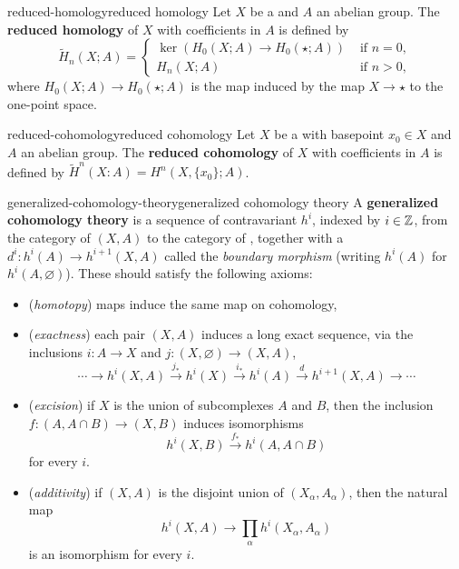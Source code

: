 \begin{topic}{reduced-homology}{reduced homology}
    Let $X$ be a  and $A$ an abelian group. The \textbf{reduced homology} of $X$ with coefficients in $A$ is defined by
    \[ \tilde{H}_n(X; A) = \left\{ \begin{array}{ll} \ker(H_0(X; A) \to H_0(\star; A)) & \text{ if } n = 0 , \\ H_n(X; A) & \text{ if } n > 0 , \end{array} \right. \]
    where $H_0(X; A) \to H_0(\star; A)$ is the map induced by the map $X \to \star$ to the one-point space.
\end{topic}

\begin{topic}{reduced-cohomology}{reduced cohomology}
    Let $X$ be a  with basepoint $x_0 \in X$ and $A$ an abelian group. The \textbf{reduced cohomology} of $X$ with coefficients in $A$ is defined by $\tilde{H}^n(X: A) = H^n(X, \{ x_0 \}; A)$.
\end{topic}

\begin{topic}{generalized-cohomology-theory}{generalized cohomology theory}
    A \textbf{generalized cohomology theory} is a sequence of contravariant  $h^i$, indexed by $i \in \mathbb{Z}$, from the category of  $(X, A)$ to the category of , together with a  $d^i : h^i(A) \to h^{i + 1}(X, A)$ called the \textit{boundary morphism} (writing $h^i(A)$ for $h^i(A, \varnothing)$). These should satisfy the following axioms:
    \begin{itemize}
        \item (\textit{homotopy})  maps induce the same map on cohomology,
        \item (\textit{exactness}) each pair $(X, A)$ induces a long exact sequence, via the inclusions $i : A \to X$ and $j : (X, \varnothing) \to (X, A)$,
        \[ \cdots \rightarrow h^i(X, A) \xrightarrow{j_*} h^i(X) \xrightarrow{i_*} h^i(A) \xrightarrow{d} h^{i + 1}(X, A) \rightarrow \cdots \]
        \item (\textit{excision}) if $X$ is the union of subcomplexes $A$ and $B$, then the inclusion $f : (A, A \cap B) \to (X, B)$ induces isomorphisms
        \[ h^i(X, B) \xrightarrow{f_*} h^i(A, A \cap B) \]
        for every $i$.
        \item (\textit{additivity}) if $(X, A)$ is the disjoint union of $(X_\alpha, A_\alpha)$, then the natural map
        \[ h^i(X, A) \to \prod_\alpha h^i(X_\alpha, A_\alpha) \]
        is an isomorphism for every $i$.
    \end{itemize}
\end{topic}

